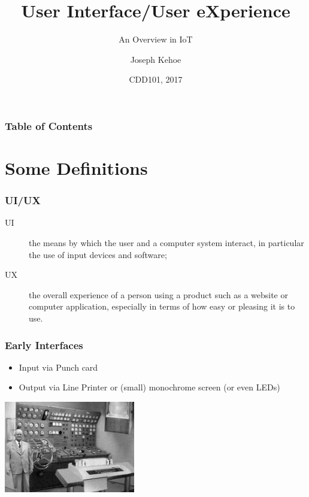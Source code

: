 \documentclass{beamer}
\title[UI/UX] %
{User Interface/User eXperience}
\subtitle{An Overview in IoT}
\author[Dr. Joseph Kehoe] %
{Joseph Kehoe\inst{1}}
\institute[IT Carlow] %
{
	\inst{1}%
	Department of Computing and Networking\\
	Institute of Technology Carlow
}
\date[ITC 2017] %
{CDD101, 2017}
\begin{document}
 
\frame{\titlepage}
 
 
 
 \begin{frame}
 	\frametitle{Table of Contents}
 	\tableofcontents
 \end{frame}
 
 
 \section{Some Definitions}
 

  \begin{frame}
  	\frametitle{UI/UX}
  	\begin{description}
  		\item[UI] the means by which the user and a computer system interact, in particular the use of input devices and software;
  		\item[UX] the overall experience of a person using a product such as a website or computer application, especially in terms of how easy or pleasing it is to use.
  	\end{description}
  	
  	
  \end{frame}

  \begin{frame}
  	\frametitle{Early Interfaces}
  	\begin{itemize}
  		\item Input via Punch card
  		\item Output via Line Printer or (small) monochrome screen (or even LEDs)
  	\end{itemize}
  	\includegraphics[height=4cm]{Old-Server.jpg}
  	
  \end{frame}
  
\end{document}
